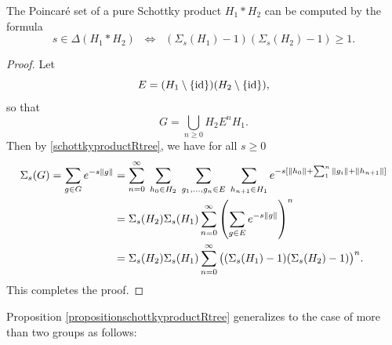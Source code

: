 \begin{proposition}
\label{propositionschottkyproductRtree}
The Poincar\'e set of a pure Schottky product $H_1\ast H_2$ can be computed by the formula
\[
s\in \Delta(H_1\ast H_2) \;\;\Leftrightarrow\;\; (\Sigma_s(H_1) - 1)(\Sigma_s(H_2) - 1) \geq 1.
\]
\end{proposition}
\begin{proof}
Let
\[
E = (H_1\setminus\{\mathrm{id}\})(H_2\setminus\{\mathrm{id}\}),
\]
so that
\[
G = \bigcup_{n\geq 0} H_2 E^n H_1.
\]
Then by \eqref{schottkyproductRtree}, we have for all $s\geq 0$
\begin{align*}
\Sigma_s(G)
= \sum_{g\in G} e^{-s\|g\|}
&= \sum_{n = 0}^\infty \; \sum_{h_0\in H_2} \; \sum_{g_1,\ldots,g_n\in E} \; \sum_{h_{n + 1}\in H_1} e^{-s[\|h_0\| + \sum_1^n \|g_i\| + \|h_{n + 1}\|]}\\
&= \Sigma_s(H_2) \Sigma_s(H_1) \sum_{n = 0}^\infty \left(\sum_{g\in E} e^{-s\|g\|}\right)^n\\
&= \Sigma_s(H_2) \Sigma_s(H_1) \sum_{n = 0}^\infty \big((\Sigma_s(H_1) - 1)(\Sigma_s(H_2) - 1)\big)^n.
\end{align*}
This completes the proof.
\end{proof}


Proposition \ref{propositionschottkyproductRtree} generalizes to the case of more than two groups as follows: 


